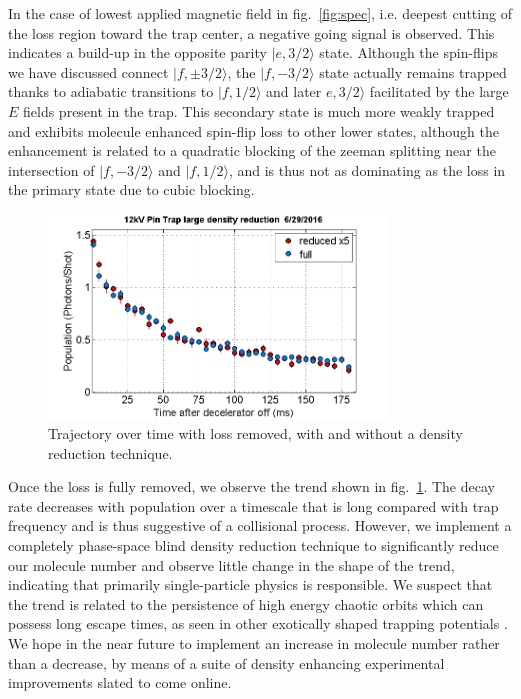 \documentclass[%
 reprint,
 amsmath,amssymb,
 aps,
prl,
]{revtex4-1}
\begin{document}
In the case of lowest applied magnetic field in fig.~\ref{fig:spec}, i.e. deepest cutting of the loss region toward the trap center, a negative going signal is observed. This indicates a build-up in the opposite parity $|e,3/2\rangle$ state. Although the spin-flips we have discussed connect $|f,\pm3/2\rangle$, the $|f,-3/2\rangle$ state actually remains trapped thanks to adiabatic transitions to $|f,1/2\rangle$ and later $e,3/2\rangle$ facilitated by the large $E$ fields present in the trap. This secondary state is much more weakly trapped and exhibits molecule enhanced spin-flip loss to other lower states, although the enhancement is related to a quadratic blocking of the zeeman splitting near the intersection of $|f,-3/2\rangle$ and $|f,1/2\rangle$, and is thus not as dominating as the loss in the primary state due to cubic blocking.

\begin{figure}
\includegraphics[width=90mm]{reduce-density-compare.png}%
\caption{
Trajectory over time with loss removed, with and without a density reduction technique.
\label{fig:timetrace}}
\end{figure}

Once the loss is fully removed, we observe the trend shown in fig.~\ref{fig:timetrace}. The decay rate decreases with population over a timescale that is long compared with trap frequency and is thus suggestive of a collisional process. However, we implement a completely phase-space blind density reduction technique to significantly reduce our molecule number and observe little change in the shape of the trend, indicating that primarily single-particle physics is responsible. We suspect that the trend is related to the persistence of high energy chaotic orbits which can possess long escape times, as seen in other exotically shaped trapping potentials \cite{Gonzalez-Ferez2014}. We hope in the near future to implement an increase in molecule number rather than a decrease, by means of a suite of density enhancing experimental improvements slated to come online.
\end{document}
